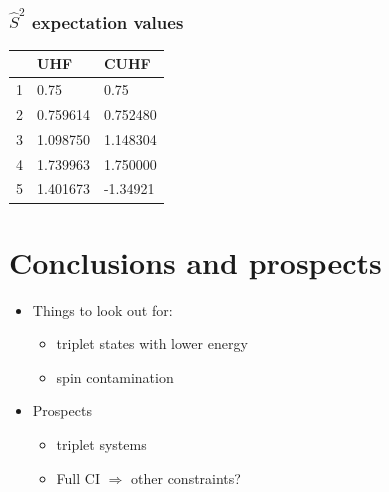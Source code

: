 \documentclass[aspectratio=169]{beamer}
\begin{document}
\begin{frame}
    \frametitle{$\hat{S}^2$ expectation values}
    \begin{table}[h]
        \label{tab:spincon}
        \begin{tabular}{l|l|l}
            & UHF      & CUHF     \\
          \hline
          1 & 0.75     & 0.75     \\
          2 & 0.759614 & 0.752480 \\
          3 & 1.098750 & 1.148304 \\
          4 & 1.739963 & 1.750000 \\
          5 & 1.401673 & -1.34921
        \end{tabular}
      \end{table}
\end{frame}
\section{Conclusions and prospects}
\begin{frame}
    \begin{itemize}
        \item Things to look out for:
        \begin{itemize}
            \item triplet states with lower energy
            \item spin contamination
        \end{itemize}
        \item Prospects
        \begin{itemize}
            \item triplet systems
            \item Full CI $\Longrightarrow$ other constraints?
        \end{itemize}
    \end{itemize}
    
\end{frame}

\titleframe
\end{document}
